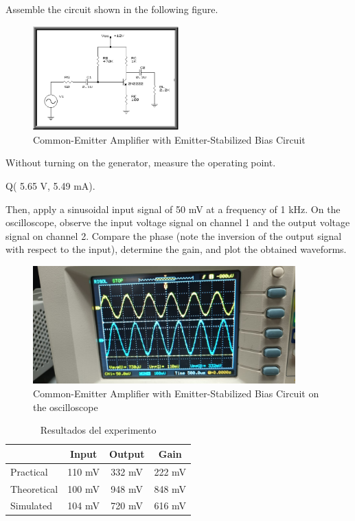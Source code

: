 Assemble the circuit shown in the following figure.
\begin{figure}[h]
    \centering
    \includegraphics[width = 0.5\textwidth]{Imagenes/Imagenes_Juan/Common-Emitter Amplifier with Emitter-Stabilized Bias Circuit.PNG}
    \caption{Common-Emitter Amplifier with Emitter-Stabilized Bias Circuit}
    \label{circuit2}
\end{figure}

Without turning on the generator, measure the operating point.

\begin{center}
    Q( 5.65 V, 5.49 mA).
\end{center}

Then, apply a sinusoidal input signal of 50 mV at a frequency of 1 kHz.
On the oscilloscope, observe the input voltage signal on channel 1 and the output voltage signal on channel 
2. Compare the phase (note the inversion of the output signal with respect to the input), determine the 
gain, and plot the obtained waveforms.

\begin{figure}[h]
    \centering
    \includegraphics[width = 0.9\textwidth]{Imagenes/Imagenes_Juan/Osciloscopio Circuito 2.jpg}
    \caption{Common-Emitter Amplifier with Emitter-Stabilized Bias Circuit on the oscilloscope}
    \label{circuit2Osciloscopio}
\end{figure}

\begin{table}[H]
\centering
\caption{Resultados del experimento}
\label{tab:resultados2}
\begin{tabular}{lccc} %
\toprule
 & Input & Output & Gain \\ 
\midrule
Practical   & 110 mV & 332 mV & 222 mV\\ 
Theoretical & 100 mV & 948 mV & 848 mV\\ 
Simulated   & 104 mV & 720 mV & 616 mV \\ 
\bottomrule
\end{tabular}
\end{table}





